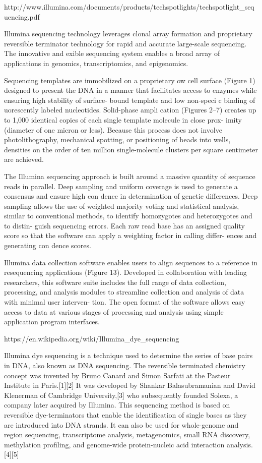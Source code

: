 http://www.illumina.com/documents/products/techspotlights/techspotlight_sequencing.pdf

Illumina sequencing technology leverages clonal array formation and proprietary reversible terminator technology for rapid and accurate large-scale sequencing. The innovative and  exible sequencing system enables a broad array of applications in genomics, transcriptomics, and epigenomics.

Sequencing templates are immobilized on a proprietary  ow cell surface (Figure 1) designed to present the DNA in a manner that facilitates access to enzymes while ensuring high stability of surface- bound template and low non-speci c binding of  uorescently labeled nucleotides. Solid-phase ampli cation (Figures 2–7) creates up to 1,000 identical copies of each single template molecule in close prox- imity (diameter of one micron or less). Because this process does not involve photolithography, mechanical spotting, or positioning of beads into wells, densities on the order of ten million single-molecule clusters per square centimeter are achieved.

The Illumina sequencing approach is built around a massive quantity of sequence reads in parallel. Deep sampling and uniform coverage is used to generate a consensus and ensure high con dence in determination of genetic differences. Deep sampling allows the use of weighted majority voting and statistical analysis, similar to conventional methods, to identify homozygotes and heterozygotes and to distin- guish sequencing errors. Each raw read base has an assigned quality score so that the software can apply a weighting factor in calling differ- ences and generating con dence scores.

Illumina data collection software enables users to align sequences to a reference in resequencing applications (Figure 13). Developed in collaboration with leading researchers, this software suite includes the full range of data collection, processing, and analysis modules to streamline collection and analysis of data with minimal user interven- tion. The open format of the software allows easy access to data at various stages of processing and analysis using simple application program interfaces.

https://en.wikipedia.org/wiki/Illumina_dye_sequencing

Illumina dye sequencing is a technique used to determine the series of base pairs in DNA, also known as DNA sequencing. The reversible terminated chemistry concept was invented by Bruno Canard and Simon Sarfati at the Pasteur Institute in Paris.[1][2] It was developed by Shankar Balasubramanian and David Klenerman of Cambridge University,[3] who subsequently founded Solexa, a company later acquired by Illumina. This sequencing method is based on reversible dye-terminators that enable the identification of single bases as they are introduced into DNA strands. It can also be used for whole-genome and region sequencing, transcriptome analysis, metagenomics, small RNA discovery, methylation profiling, and genome-wide protein-nucleic acid interaction analysis.[4][5]

